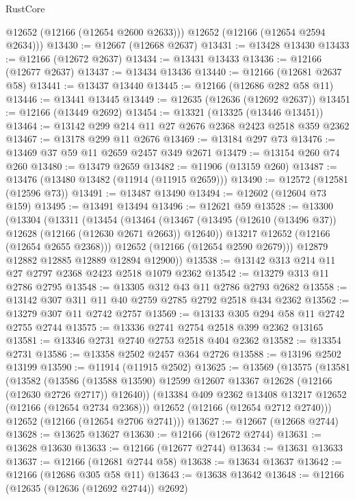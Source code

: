 \begin{lexlean}{RustCore}
\begin{coremodule}
        @12652
        (@12166 (@12654 @2600 @2633)))
      @12652
      (@12166 (@12654 @2594 @2634)))
@13430 := @12667 (@12668 @2637)
@13431 := @13428 @13430
@13433 := @12166 (@12672 @2637)
@13434 := @13431 @13433
@13436 := @12166 (@12677 @2637)
@13437 := @13434 @13436
@13440 := @12166 (@12681 @2637 @58)
@13441 := @13437 @13440
@13445 := @12166 (@12686 @282 @58 @11)
@13446 := @13441 @13445
@13449 := @12635 (@12636 (@12692 @2637))
@13451 := @12166 (@13449 @2692)
@13454 := @13321 (@13325 (@13446 @13451))
@13464 := @13142 @299 @214 @11 @27 @2676 @2368 @2423 @2518 @359 @2362
@13467 := @13178 @299 @11 @2676
@13469 := @13184 @297 @73
@13476 := @13469 @37 @59 @11 @2659 @2457 @349 @2671
@13479 := @13154 @260 @74 @260
@13480 := @13479 @2659
@13482 := @11906 (@13159 @260)
@13487 := @13476 (@13480 @13482 (@11914 (@11915 @2659)))
@13490 := @12572 (@12581 (@12596 @73))
@13491 := @13487 @13490
@13494 := @12602 (@12604 @73 @159)
@13495 := @13491 @13494
@13496 := @12621 @59
@13528 := @13300
    (@13304
      (@13311
        (@13454
          (@13464
            (@13467 (@13495 (@12610 (@13496 @37)) @12628 (@12166 (@12630 @2671 @2663)) @12640))
            @13217
            @12652
            (@12166 (@12654 @2655 @2368)))
          @12652
          (@12166 (@12654 @2590 @2679)))
        @12879
        @12882
        @12885
        @12889
        @12894
        @12900))
@13538 := @13142 @313 @214 @11 @27 @2797 @2368 @2423 @2518 @1079 @2362
@13542 := @13279 @313 @11 @2786 @2795
@13548 := @13305 @312 @43 @11 @2786 @2793 @2682
@13558 := @13142 @307 @311 @11 @40 @2759 @2785 @2792 @2518 @434 @2362
@13562 := @13279 @307 @11 @2742 @2757
@13569 := @13133 @305 @294 @58 @11 @2742 @2755 @2744
@13575 := @13336 @2741 @2754 @2518 @399 @2362 @13165
@13581 := @13346 @2731 @2740 @2753 @2518 @404 @2362
@13582 := @13354 @2731
@13586 := @13358 @2502 @2457 @364 @2726
@13588 := @13196 @2502 @13199
@13590 := @11914 (@11915 @2502)
@13625 := @13569
    (@13575
      (@13581
        (@13582
          (@13586 (@13588 @13590) @12599 @12607 @13367 @12628 (@12166 (@12630 @2726 @2717)) @12640))
        (@13384 @409 @2362 @13408 @13217 @12652 (@12166 (@12654 @2734 @2368)))
        @12652
        (@12166 (@12654 @2712 @2740)))
      @12652
      (@12166 (@12654 @2706 @2741)))
@13627 := @12667 (@12668 @2744)
@13628 := @13625 @13627
@13630 := @12166 (@12672 @2744)
@13631 := @13628 @13630
@13633 := @12166 (@12677 @2744)
@13634 := @13631 @13633
@13637 := @12166 (@12681 @2744 @58)
@13638 := @13634 @13637
@13642 := @12166 (@12686 @305 @58 @11)
@13643 := @13638 @13642
@13648 := @12166 (@12635 (@12636 (@12692 @2744)) @2692)

\end{coremodule}
\end{lexlean}

